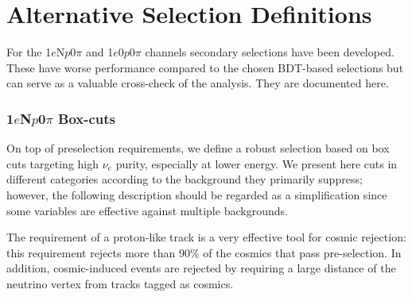 \documentclass[a4paper]{article}
\newcommand{\npsel}{1$e$N$p$0$\pi$\xspace}
\newcommand{\zpsel}{1$e$0$p$0$\pi$\xspace}
\begin{document}

\section{Alternative Selection Definitions}
\label{app:nueslections}

For the \npsel and \zpsel channels secondary selections have been developed. These have worse performance compared to the chosen BDT-based selections but can serve as a valuable cross-check of the analysis. They are documented here.

\subsubsection{\npsel Box-cuts}
\label{app:nueslections:1eNp}


On top of preselection requirements, we define a robust selection based on box cuts targeting high $\nu_e$ purity, especially at lower energy.
We present here cuts in different categories according to the background they primarily suppress; however,  the following description should be regarded as a simplification since some variables are effective against multiple backgrounds.

The requirement of a proton-like track is a very effective tool for cosmic rejection: this requirement rejects more than 90\% of the cosmics that pass pre-selection. In addition, cosmic-induced events are rejected by requiring a large distance of the neutrino vertex from tracks tagged as cosmics. 
\end{document}
